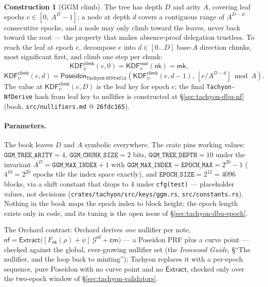 \documentclass[11pt,a4paper]{article}
\theoremstyle{definition}
\newtheorem{construction}[theorem]{Construction}
\newcommand{\nfsym}{\mathsf{nf}}
\newcommand{\cmsym}{\mathsf{cm}}
\newcommand{\Extract}{\ensuremath{\mathsf{Extract}}}
\newcommand{\nksym}{\ensuremath{\mathsf{nk}}}
\begin{document}
\begin{construction}[GGM climb]\label{def:tachyon-design-climb}
The tree has depth $D$ and arity $A$, covering leaf epochs
$e \in [0,\ A^D - 1]$; a node at depth $d$ covers a contiguous range of
$A^{D-d}$ consecutive epochs, and a node may only climb toward the leaves,
never back toward the root --- the property that makes absence-proof
delegation trustless. To reach the leaf at epoch $e$, decompose $e$ into
$d \in [0 \ldots D]$ base-$A$ direction chunks, most significant first, and
climb one step per chunk:
\[
\mathsf{KDF}^{\mathsf{climb}}_\psi(e, 0) =
  \mathsf{KDF}^{\mathsf{root}}_\psi(\nksym) = \mathsf{mk},
\]
\[
\mathsf{KDF}^{\mathsf{climb}}_\psi(e, d) =
  \mathsf{Poseidon}_{\texttt{Tachyon-NfPrefix}}\!\left(
    \mathsf{KDF}^{\mathsf{climb}}_\psi(e, d-1),\
    \left\lfloor e / A^{D-d} \right\rfloor \bmod A
  \right).
\]
The value at $\mathsf{KDF}^{\mathsf{climb}}_\psi(e, D)$ is the leaf key for
epoch $e$; the final \texttt{Tachyon-NfDerive} hash from leaf key to
nullifier is constructed at \S\ref{sec:tachyon-dbu-nf} (book,
\texttt{src/nullifiers.md} @ \texttt{26fdc165}).
\end{construction}

\paragraph{Parameters.} The book leaves $D$ and $A$ symbolic everywhere.
The crate pins working values: $\texttt{GGM\_TREE\_ARITY} = 4$,
$\texttt{GGM\_CHUNK\_SIZE} = 2$ bits, $\texttt{GGM\_TREE\_DEPTH} = 10$
under the invariant $A^D = \texttt{GGM\_MAX\_INDEX} + 1$ with
$\texttt{GGM\_MAX\_INDEX} = \texttt{EPOCH\_MAX} = 2^{20} - 1$ ($4^{10} =
2^{20}$ epochs tile the index space exactly), and $\texttt{EPOCH\_SIZE} =
2^{12} = 4096$ blocks, via a shift constant that drops to $4$ under
\texttt{cfg(test)} --- placeholder values, not decisions
(\texttt{crates/tachyon/src/keys/ggm.rs}, \texttt{src/constants.rs}).
Nothing in the book maps the epoch index to block height; the epoch length
exists only in code, and its tuning is the open issue of
\S\ref{sec:tachyon-dbu-epoch}.

The Orchard contrast: Orchard derives \emph{one} nullifier per note,
$\nfsym = \Extract\bigl([F_{\nksym}(\rho) + \psi]\,\mathcal{G}^{\nfsym} +
\cmsym\bigr)$ --- a Poseidon PRF plus a curve point --- checked against the
global, ever-growing nullifier set (the \emph{Ironwood Guide},
\S``The nullifier, and the loop back to minting''); Tachyon replaces it with
a per-epoch sequence, pure Poseidon with no curve point and no
$\Extract$, checked only over the two-epoch window of
\S\ref{sec:tachyon-validators}.
\end{document}
